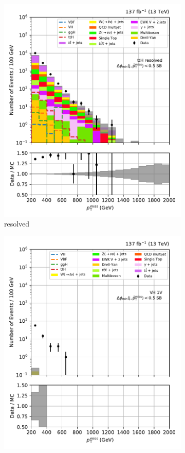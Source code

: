 \begin{figure}[htbp]
\begin{subfigure}[b]{0.24\textwidth}
        \includegraphics[width=\textwidth]{figures/region_plots/full_Run2/sideband_2/ttH_resolved.pdf}
        \caption{\ttH resolved}
    \end{subfigure}
    \hfill
    \begin{subfigure}[b]{0.24\textwidth}
        \includegraphics[width=\textwidth]{figures/region_plots/full_Run2/sideband_2/VH_1V.pdf}

\end{subfigure}
\end{figure}
